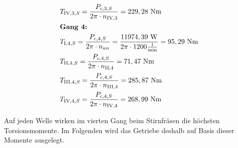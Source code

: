 \begin{itemize}
\begin{align*}
	&T_{\mathord{\mathrm{IV}},3,S} = \frac{P_{c,3,S}}{2 \pi \cdot n_{\mathord{\mathrm{IV}},3}} = 229,28 \text{ Nm} \\
	&\textbf{Gang 4: } \\
	&T_{\mathord{\mathrm{I}},4,S} = \frac{P_{c,4,S}}{2 \pi \cdot n_{an}} = \frac{11974,39 \text{ W} }{2 \pi \cdot 1200 \frac{1}{\text{min}}} =95,29 \text{ Nm} \\
	&T_{\mathord{\mathrm{II}},4,S} = \frac{P_{c,4,S}}{2 \pi \cdot n_{\mathord{\mathrm{II}},4}} =71,47\text{ Nm} \\
	&T_{\mathord{\mathrm{III}},4,S} = \frac{P_{c,4,S}}{2 \pi \cdot n_{\mathord{\mathrm{III}},4}} = 285,87 \text{ Nm} \\
	&T_{\mathord{\mathrm{IV}},4,S} = \frac{P_{c,4,S}}{2 \pi \cdot n_{\mathord{\mathrm{IV}},4}} =268,99 \text{ Nm} \\
\end{align*}	
\end{itemize}
Auf jeden Welle wirken im vierten Gang beim Stirnfräsen die höchsten Torsionsmomente. Im Folgenden wird das Getriebe deshalb auf Basis dieser Momente ausgelegt.
\newpage
